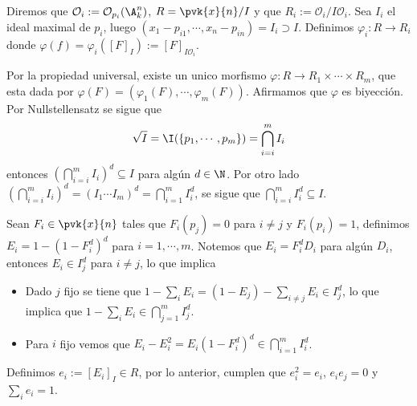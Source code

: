 \documentclass{article}
\begin{document}
\begin{dem}
    Diremos que $\mathcal{O}_{i}:=\mathcal{O}_{p_{i}}(\A_{k}^{n})$, $R=\pvk{x}{n}/I$ y que 
    $R_{i}:=\mathcal{O}_{i}/I\mathcal{O}_{i}$. Sea $I_{i}$ el ideal maximal de $p_{i}$, luego
    $(x_{1}-p_{i1},\cdots,x_{n}-p_{in})=I_{i}\supset I$. Definimos $\varphi_{i}:R\to R_{i}$ donde
    $\varphi(f)=\varphi_{i}([F]_{I}):=[F]_{I\mathcal{O}_{i}}$.

    \vspace{4mm}
    \noindent Por la propiedad universal, existe un unico morfismo 
    $\varphi:R\to R_{1}\times\cdots\times R_{m}$, que esta dada por $\varphi(F)=
    (\varphi_{1}(F),\cdots,\varphi_{m}(F))$. Afirmamos que $\varphi$ es biyección. Por 
    Nullstellensatz se sigue que
    \begin{equation*}
        \sqrt{I}=\I(\{p_{1},\cdots,p_{m}\})=\bigcap_{i=i}^{m}I_{i}
    \end{equation*}
    entonces $\left(\bigcap_{i=i}^{m}I_{i}\right)^{d}\subseteq I$ para algún $d\in\N$. Por otro 
    lado $\left(\bigcap_{i=i}^{m}I_{i}\right)^{d}=\left(I_{1}\cdots I_{m}\right)^{d}=
    \bigcap_{i=1}^{m}I_{i}^{d}$, se sigue que $\bigcap_{i=i}^{m}I_{i}^{d}\subseteq I$. 
    
    \vspace{4mm}
    \noindent Sean $F_{i}\in\pvk{x}{n}$ tales que $F_{i}(p_{j})=0$ para $i\neq j$ y 
    $F_{i}(p_{i})=1$, definimos $E_{i}=1-(1-F_{i}^{d})^{d}$ para $i=1,\cdots,m$. Notemos que 
    $E_{i}=F_{i}^{d}D_{i}$ para algún $D_{i}$, entonces $E_{i}\in I_{j}^{d}$ para $i\neq j$, lo que
    implica
    \begin{itemize}
        \item Dado $j$ fijo se tiene que $1-\sum_{i}E_{i}=(1-E_{j})-\sum_{i\neq j}E_{i}\in 
        I_{j}^{d}$, lo que implica que $1-\sum_{i}E_{i}\in\bigcap_{j=1}^{m}I_{j}^{d}$.

        \item Para $i$ fijo vemos que $E_{i}-E_{i}^{2}=E_{i}(1-F_{i}^{d})^{d}\in
        \bigcap_{i=1}^{m}I_{i}^{d}$.
    \end{itemize}
    Definimos $e_{i}:=[E_{i}]_{I}\in R$, por lo anterior, cumplen que $e_{i}^{2}=e_{i}$, 
    $e_{i}e_{j}=0$ y $\sum_{i}e_{i}=1$.
    

\end{dem}
\end{document}
